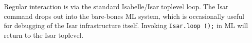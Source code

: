 \begin{isabellebody}
\begin{isamarkuptext}
  Regular interaction is via the standard Isabelle/Isar toplevel loop.
  The Isar command \hyperlink{command.exit}{\mbox{}} drops out into the bare-bones ML
  system, which is occasionally useful for debugging of the Isar
  infrastructure itself.  Invoking \verb|Isar.loop|~\verb|();|
  in ML will return to the Isar toplevel.%
\end{isamarkuptext}%
\isamarkuptrue%
%
\isadelimtheory
%
\endisadelimtheory
%
\isatagtheory
{}\isamarkupfalse%
%
\endisatagtheory
{\isafoldtheory}%
%
\isadelimtheory
%
\endisadelimtheory
\end{isabellebody}%
